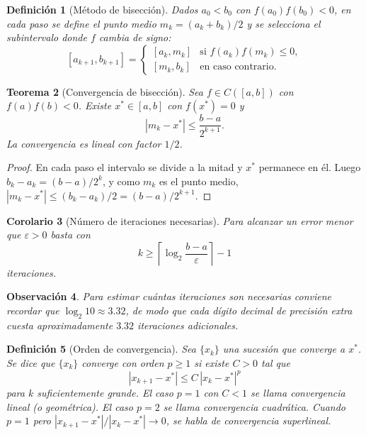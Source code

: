 \documentclass[a4paper,11pt]{report}
\newtheorem{theorem}{Teorema}[chapter]
\newtheorem{corollary}[theorem]{Corolario}
\newtheorem{definition}[theorem]{Definición}
\newtheorem{remark}[theorem]{Observación}
\begin{document}
\begin{definition}[Método de bisección]\label{def:biseccion}
Dados $a_0<b_0$ con $f(a_0)f(b_0)<0$, en cada paso se define el punto medio
$m_k=(a_k+b_k)/2$ y se selecciona el subintervalo donde $f$ cambia de signo:
\[
[a_{k+1},b_{k+1}]=
\begin{cases}
[a_k,m_k] & \text{si } f(a_k)f(m_k)\le 0,\\
[m_k,b_k] & \text{en caso contrario.}
\end{cases}
\]
\end{definition}

\begin{theorem}[Convergencia de bisección]\label{thm:convergencia_biseccion}
Sea $f\in C([a,b])$ con $f(a)f(b)<0$.  Existe $x^*\in[a,b]$ con $f(x^*)=0$ y
\[
|m_k-x^*|\le\frac{b-a}{2^{k+1}}.
\]
La convergencia es lineal con factor $1/2$.
\end{theorem}

\begin{proof}
En cada paso el intervalo se divide a la mitad y $x^*$ permanece en él.
Luego $b_k-a_k=(b-a)/2^k$, y como $m_k$ es el punto medio,
$|m_k-x^*|\le(b_k-a_k)/2=(b-a)/2^{k+1}$.
\end{proof}

\begin{corollary}[Número de iteraciones necesarias]\label{cor:biseccion_iter}
Para alcanzar un error menor que $\varepsilon>0$ basta con
\[
k\ge\left\lceil\log_2\!\frac{b-a}{\varepsilon}\right\rceil-1
\]
iteraciones.
\end{corollary}

\begin{remark}
Para estimar cuántas iteraciones son necesarias conviene recordar que
$\log_2 10\approx 3.32$, de modo que cada dígito decimal de precisión extra cuesta
aproximadamente $3.32$ iteraciones adicionales.
\end{remark}

\begin{definition}[Orden de convergencia]\label{def:orden_convergencia}
Sea $\{x_k\}$ una sucesión que converge a $x^*$.  Se dice que $\{x_k\}$
\emph{converge con orden $p\ge1$} si existe $C>0$ tal que
\[
|x_{k+1}-x^*|\le C\,|x_k-x^*|^p
\]
para $k$ suficientemente grande.  El caso $p=1$ con $C<1$ se llama
\emph{convergencia lineal} (o geométrica).  El caso $p=2$ se llama
\emph{convergencia cuadrática}.  Cuando $p=1$ pero
$|x_{k+1}-x^*|/|x_k-x^*|\to0$, se habla de \emph{convergencia superlineal}.
\end{definition}
\end{document}
